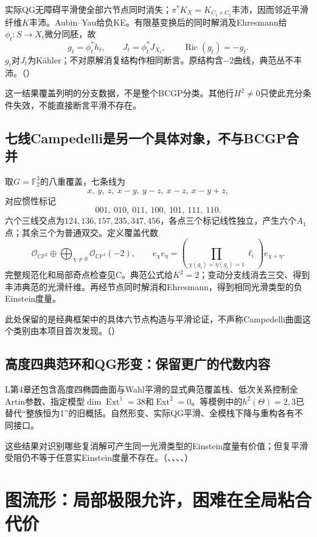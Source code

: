 \documentclass[UTF8,fontset=fandol,zihao=-4]{ctexart}
\theoremstyle{research}
\DeclareMathOperator{\Ric}{Ric}
\newcommand{\CP}{\mathbb{CP}}
\numberwithin{equation}{section}
\begin{document}
实际QG无障碍平滑使全部六节点同时消失；$\pi^*K_X=K_{C_1\times C_2}$丰沛，因而邻近平滑纤维$K$丰沛。Aubin--Yau给负KE。有限基变换后的同时解消及Ehresmann给$\phi_t:S\to X_t$微分同胚，故
\[
g_t=\phi_t^*h_t,\qquad J_t=\phi_t^*J_{X_t},\qquad\Ric(g_t)=-g_t.
\]
$g_t$对$J_t$为Kähler；不对原解消复结构作相同断言。原结构含$-2$曲线，典范丛不丰沛。\cite{C}（）\cite{LeePark}

这一结果覆盖列明的分支数据，不是整个BCGP分类。其他行$H^2\ne0$只使此充分条件失效，不能直接断言平滑不存在。

\subsection{七线Campedelli是另一个具体对象，不与BCGP合并}
取$G=\mathbb F_2^3$的八重覆盖，七条线为
\[
x,\ y,\ z,\ x-y,\ y-z,\ x-z,\ x-y+z,
\]
对应惯性标记
\[
001,\ 010,\ 011,\ 100,\ 101,\ 111,\ 110.
\]
六个三线交点为$124,136,157,235,347,456$，各点三个标记线性独立，产生六个$A_1$点；其余三个为普通双交。定义覆盖代数
\[
\mathcal O_{\CP^2}\oplus\bigoplus_{\chi\ne0}\mathcal O_{\CP^2}(-2),
\qquad
 e_\chi e_\eta=
 \left(\prod_{\chi(g_i)=\eta(g_i)=1}\ell_i\right)e_{\chi+\eta}.
\]
完整规范化和局部奇点检查见C。典范公式给$K^2=2$；变动分支线消去三交、得到丰沛典范的光滑纤维。再经节点同时解消和Ehresmann，得到相同光滑类型的负Einstein度量。

此处保留的是经典框架中的具体六节点构造与平滑论证，不声称Campedelli曲面这个类别由本项目首次发现。\cite{C}（）\cite{AP}

\subsection{高度四典范环和QG形变：保留更广的代数内容}
L第4章还包含高度四椭圆曲面与Wahl平滑的显式典范覆盖栈、低次关系控制全Artin参数、指定模型$\dim\operatorname{Ext}^1=38$和$\operatorname{Ext}^2=0$。等模例中的$h^2(\Theta)=2,3$已替代“整族恒为1”的旧概括。自然形变、实际QG平滑、全模栈下降与重构各有不同接口。

这些结果对识别哪些复消解可产生同一光滑类型的Einstein度量有价值；但复平滑受阻仍不等于任意实Einstein度量不存在。\cite{L}（、、、、）

\section{图流形：局部极限允许，困难在全局粘合代价}
\end{document}
